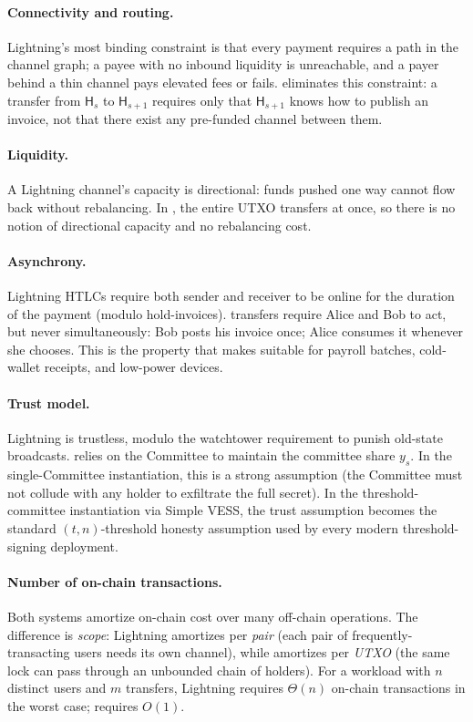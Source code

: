 \paragraph{Connectivity and routing.} Lightning's most binding constraint is that every payment requires a path in the channel graph; a payee with no inbound liquidity is unreachable, and a payer behind a thin channel pays elevated fees or fails. \thunderbolt eliminates this constraint: a transfer from $\mathsf{H}_s$ to $\mathsf{H}_{s+1}$ requires only that $\mathsf{H}_{s+1}$ knows how to publish an invoice, not that there exist any pre-funded channel between them.

\paragraph{Liquidity.} A Lightning channel's capacity is directional: funds pushed one way cannot flow back without rebalancing. In \thunderbolt, the entire UTXO transfers at once, so there is no notion of directional capacity and no rebalancing cost.

\paragraph{Asynchrony.} Lightning HTLCs require both sender and receiver to be online for the duration of the payment (modulo hold-invoices). \thunderbolt transfers require Alice and Bob to act, but never simultaneously: Bob posts his invoice once; Alice consumes it whenever she chooses. This is the property that makes \thunderbolt suitable for payroll batches, cold-wallet receipts, and low-power devices.

\paragraph{Trust model.} Lightning is trustless, modulo the watchtower requirement to punish old-state broadcasts. \thunderbolt relies on the Committee to maintain the committee share $y_s$. In the single-Committee instantiation, this is a strong assumption (the Committee must not collude with any holder to exfiltrate the full secret). In the threshold-committee instantiation via Simple VESS, the trust assumption becomes the standard $(t, n)$-threshold honesty assumption used by every modern threshold-signing deployment.

\paragraph{Number of on-chain transactions.} Both systems amortize on-chain cost over many off-chain operations. The difference is \emph{scope}: Lightning amortizes per \emph{pair} (each pair of frequently-transacting users needs its own channel), while \thunderbolt amortizes per \emph{UTXO} (the same lock can pass through an unbounded chain of holders). For a workload with $n$ distinct users and $m$ transfers, Lightning requires $\Theta(n)$ on-chain transactions in the worst case; \thunderbolt requires $O(1)$.


